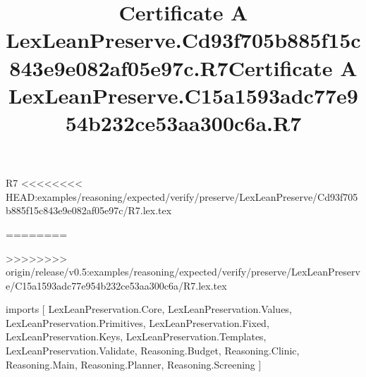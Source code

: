 \begin{lexlean}{R7}
<<<<<<<< HEAD:examples/reasoning/expected/verify/preserve/LexLeanPreserve/Cd93f705b885f15c843e9e082af05e97c/R7.lex.tex
\title{Certificate A LexLeanPreserve.Cd93f705b885f15c843e9e082af05e97c.R7}
========
\title{Certificate A LexLeanPreserve.C15a1593adc77e954b232ce53aa300c6a.R7}
>>>>>>>> origin/release/v0.5:examples/reasoning/expected/verify/preserve/LexLeanPreserve/C15a1593adc77e954b232ce53aa300c6a/R7.lex.tex
\begin{coremodule}
imports [
  LexLeanPreservation.Core,
  LexLeanPreservation.Values,
  LexLeanPreservation.Primitives,
  LexLeanPreservation.Fixed,
  LexLeanPreservation.Keys,
  LexLeanPreservation.Templates,
  LexLeanPreservation.Validate,
  Reasoning.Budget,
  Reasoning.Clinic,
  Reasoning.Main,
  Reasoning.Planner,
  Reasoning.Screening
]


\end{coremodule}
\end{lexlean}
